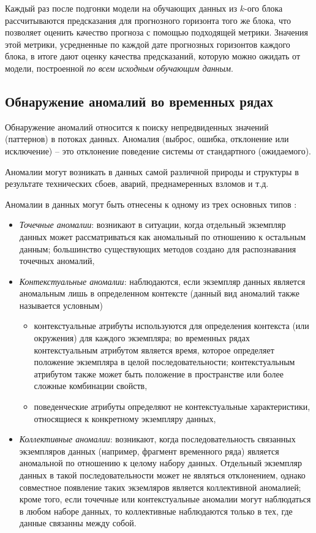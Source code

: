 \documentclass[%
	11pt,
	a4paper,
	utf8,
		]{article}
\begin{document}
Каждый раз после подгонки модели на обучающих данных из $ k $-ого блока рассчитываются предсказания для прогнозного горизонта того же блока, что позволяет оценить качество прогноза с помощью подходящей метрики. Значения этой метрики, усредненные по каждой дате прогнозных горизонтов каждого блока, в итоге дают оценку качества предсказаний, которую можно ожидать от модели, построенной \emph{по всем исходным обучающим данным}.

\subsection{Обнаружение аномалий во временных рядах}

Обнаружение аномалий относится к поиску непредвиденных значений (паттернов) в потоках данных. Аномалия (выброс, ошибка, отклонение или исключение) -- это отклонение поведение системы от стандартного (ожидаемого).

Аномалии могут возникать в данных самой различной природы и структуры в результате технических сбоев, аварий, преднамеренных взломов и т.д.

Аномалии в данных могут быть отнесены к одному из трех основных типов \cite{chandola:2009}:
\begin{itemize}
	\item \emph{Точечные аномалии}: возникают в ситуации, когда отдельный экземпляр данных может рассматриваться как аномальный по отношению к остальным данным; большинство существующих методов создано для распознавания точечных аномалий,
	
	\item \emph{Контекстуальные аномалии}: наблюдаются, если экземпляр данных является аномальным лишь в определенном контексте (данный вид аномалий также называется условным)
	
	\begin{itemize}
		\item контекстуальные атрибуты используются для определения контекста (или окружения) для каждого экземпляра; во временных рядах контекстуальным атрибутом является время, которое определяет положение экземпляра в целой последовательности; контекстуальным атрибутом также может быть положение в пространстве или более сложные комбинации свойств,
		
		\item поведенческие атрибуты определяют не контекстуальные характеристики, относящиеся к конкретному экземпляру данных,
	\end{itemize}
	
	\item \emph{Коллективные аномалии}: возникают, когда последовательность связанных экземпляров данных (например, фрагмент временного ряда) является аномальной по отношению к целому набору данных. Отдельный экземпляр данных в такой последовательности может не являться отклонением, однако совместное появление таких экземляров является коллективной аномалией; кроме того, если точечные или контекстуальные аномалии могут наблюдаться в любом наборе данных, то коллективные наблюдаются только в тех, где данные связанны между собой.
\end{itemize}
\end{document}
